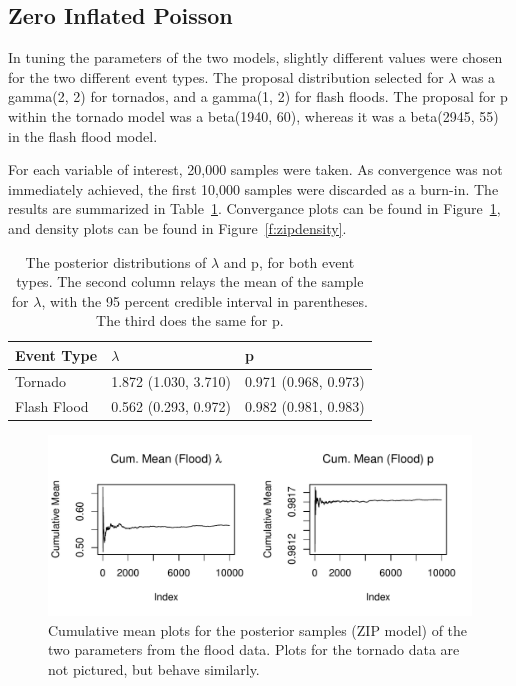 \documentclass{article}\usepackage[]{graphicx}\usepackage[]{color}
\begin{document}
\subsection{Zero Inflated Poisson}
\label{ss:rZiPoisson}

In tuning the parameters of the two models, slightly different values were chosen for the two different event types. The proposal distribution selected for $\lambda$ was a gamma(2, 2) for tornados, and a gamma(1, 2) for flash floods. The proposal for p within the tornado model was a beta(1940, 60), whereas it was a beta(2945, 55) in the flash flood model. 

For each variable of interest, 20,000 samples were taken. As convergence was not immediately achieved, the first 10,000 samples were discarded as a burn-in. The results are summarized in Table~\ref{t:rZIP}. Convergance plots can be found in Figure~\ref{f:zipconv}, and density plots can be found in Figure~\ref{f:zipdensity}.

\begin{table}
    \centering
    \caption{The posterior distributions of $\lambda$ and p, for both event types. The second column relays the mean of the sample for $\lambda$, with the 95 percent credible interval in parentheses. The third does the same for p.}
    \label{t:rZIP}
    \begin{tabular}{| l | l | l |}
    \hline
    Event Type & $\lambda$ & p  \\ \hline
    Tornado & 1.872 (1.030, 3.710) & 0.971 (0.968, 0.973) \\ \hline
    Flash Flood & 0.562 (0.293, 0.972) & 0.982 (0.981, 0.983) \\ \hline
    \end{tabular}
\end{table}

\begin{figure}[p]
\centering
\includegraphics[width=.65\textwidth]{figure/ZIP_Flood_Conv.pdf}
\caption{Cumulative mean plots for the posterior samples (ZIP model) of the two parameters from the flood data. Plots for the tornado data are not pictured, but behave similarly.}
\label{f:zipconv}
\end{figure}
\end{document}
